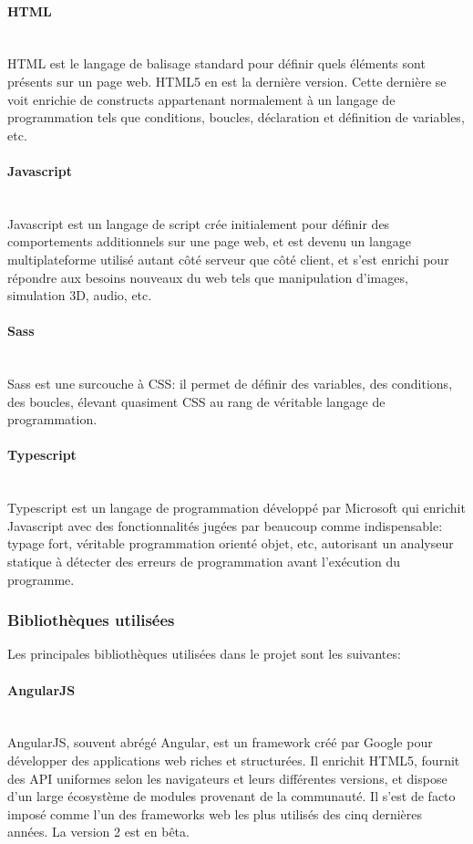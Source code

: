 \documentclass[a4paper,french,12pt]{article}
\begin{document}
			\paragraph{HTML}~\\	
			HTML est le langage de balisage standard pour définir quels éléments sont présents sur un page web. HTML5 en est la dernière version. Cette dernière se voit enrichie de constructs appartenant normalement à un langage de programmation tels que conditions, boucles, déclaration et définition de variables, etc.
			
		
			\paragraph{Javascript}~\\	
			Javascript est un langage de script crée initialement pour 
			définir des comportements additionnels sur une page web, et 				est devenu un langage multiplateforme utilisé autant côté serveur que côté client, et s'est enrichi pour répondre aux besoins nouveaux du web tels que manipulation d'images, simulation 3D, audio, etc.
			
			\paragraph{Sass}~\\	
			Sass est une surcouche à CSS: il permet de définir des variables, des conditions, des boucles, élevant quasiment CSS au rang de véritable langage de programmation.
			
			\paragraph{Typescript} ~\\	
			Typescript est un langage de programmation développé par Microsoft qui enrichit Javascript avec des fonctionnalités jugées par beaucoup comme indispensable: typage fort, véritable programmation orienté objet, etc, autorisant un analyseur statique à détecter des erreurs de programmation avant l'exécution du programme.

		\subsubsection{Bibliothèques utilisées}
		Les principales bibliothèques utilisées dans le projet sont les suivantes:

		  \paragraph{AngularJS}~\\	
		  	AngularJS, souvent abrégé Angular, est un framework créé par Google pour développer des applications web riches et structurées.
		  	Il enrichit HTML5, fournit des API uniformes selon les navigateurs et leurs différentes versions, et dispose d'un large écosystème de modules provenant de la communauté.
		  	Il s'est de facto imposé comme l'un des frameworks web les plus utilisés des cinq dernières années. La version 2 est en bêta.
\end{document}
